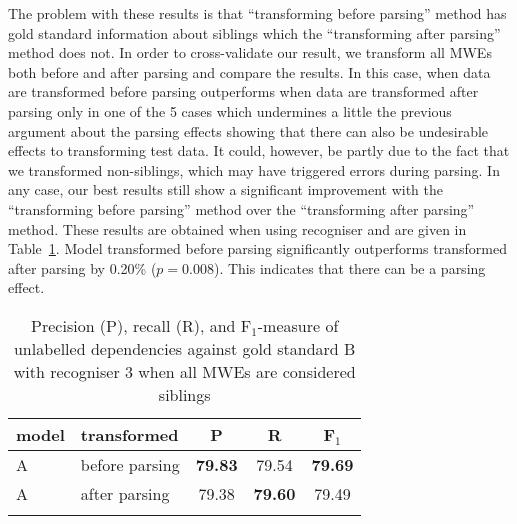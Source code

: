 \documentclass[output=paper]{langsci/langscibook}
\begin{document}
\indent The problem with these results is that ``transforming before parsing'' method has gold standard information about siblings which the ``transforming after parsing'' method does not. In order to cross-validate our result, we transform all MWEs both before and after parsing and compare the results. In this case, {\modelA} when data are transformed before parsing outperforms {\modelA} when data are transformed after parsing only in one of the 5 cases which undermines a little the previous argument about the parsing effects showing that there can also be undesirable effects to transforming test data. It could, however, be partly due to the fact that we transformed non-siblings, which may have triggered errors during parsing. In any case, our best results still show a significant improvement with the ``transforming before parsing'' method over the ``transforming after parsing'' method. These results are obtained when using recogniser and are given in Table~\ref{del:tab:res1tris}. Model transformed before parsing significantly outperforms {\modelA} transformed after parsing by 0.20\% ($p=0.008$). This indicates that there can be a parsing effect.

\begin{table}[h]
    \centering
    \begin{tabular}{l l c c c} %
      \lsptoprule
        \textnormal{model}
        & \textnormal{transformed}
        & \textnormal{P}
        & \textnormal{R}
        & \textnormal{F$_1$}
        \\ %
        \midrule
        A & before parsing &\textbf{79.83} & 79.54  & \textbf{79.69} \\
        A & after parsing &79.38  &\textbf{79.60}  & 79.49 \tabularnewline %
        \lspbottomrule
    \end{tabular}
    \caption{Precision (P), recall (R), and F$_1$-measure of unlabelled dependencies against gold standard B with recogniser 3 when all MWEs are considered siblings \label{del:tab:res1tris}}
\end{table}
\end{document}
